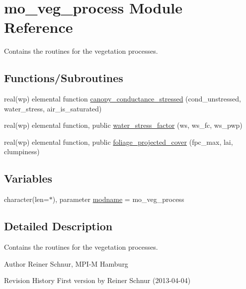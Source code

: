 \hypertarget{namespacemo__veg__process}{}\section{mo\+\_\+veg\+\_\+process Module Reference}
\label{namespacemo__veg__process}


Contains the routines for the vegetation processes.  


\subsection*{Functions/\+Subroutines}
\begin{DoxyCompactItemize}
\item 
real(wp) elemental function \hyperlink{namespacemo__veg__process_ab70d91c72a0af795f8a8a4dcd8687d69}{canopy\+\_\+conductance\+\_\+stressed} (cond\+\_\+unstressed, water\+\_\+stress, air\+\_\+is\+\_\+saturated)
\item 
real(wp) elemental function, public \hyperlink{namespacemo__veg__process_a08781664d42770f4962218de89b6387d}{water\+\_\+stress\+\_\+factor} (ws, ws\+\_\+fc, ws\+\_\+pwp)
\item 
real(wp) elemental function, public \hyperlink{namespacemo__veg__process_a274a1f4ec71f0e64f08d19c388367d89}{foliage\+\_\+projected\+\_\+cover} (fpc\+\_\+max, lai, clumpiness)
\end{DoxyCompactItemize}
\subsection*{Variables}
\begin{DoxyCompactItemize}
\item 
character(len=$\ast$), parameter \hyperlink{namespacemo__veg__process_a38c37cf4dadc4e6507b052eb4357357f}{modname} = \textquotesingle{}mo\+\_\+veg\+\_\+process\textquotesingle{}
\end{DoxyCompactItemize}


\subsection{Detailed Description}
Contains the routines for the vegetation processes. 

\begin{DoxyAuthor}{Author}
Reiner Schnur, M\+P\+I-\/\+M Hamburg
\end{DoxyAuthor}
\begin{DoxyParagraph}{Revision History}
First version by Reiner Schnur (2013-\/04-\/04) 
\end{DoxyParagraph}


